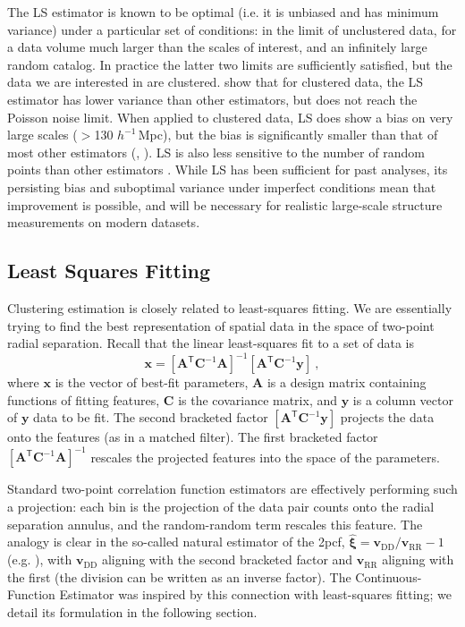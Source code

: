 \documentclass[modern]{aastex62}
\newcommand{\cf}{2pcf\xspace} %
\newcommand{\Est}{The Continuous-Function Estimator\xspace}
\newcommand{\LS}{LS\xspace}
\newcommand{\inv}{^{-1}}
\newcommand{\T}{^{\mathsf{T}}}
\newcommand{\hmpc}{$h^{-1}\,$Mpc}
\newcommand{\bld}[1]{\bm{#1}} %
\newcommand{\vv}[1]{\bld{v}_\mathrm{#1}}
\begin{document}
The \LS estimator is known to be optimal (i.e. it is unbiased and has minimum variance) under a particular set of conditions: in the limit of unclustered data, for a data volume much larger than the scales of interest, and an infinitely large random catalog. 
In practice the latter two limits are sufficiently satisfied, but the data we are interested in are clustered.
\cite{VargasMagana2013} show that for clustered data, the \LS estimator has lower variance than other estimators, but does not reach the Poisson noise limit.
When applied to clustered data, \LS does show a bias on very large scales ($>$130 \hmpc), but the bias is significantly smaller than that of most other estimators (\citealt{Kerscher1999}, \citealt{VargasMagana2013}).
\LS is also less sensitive to the number of random points than other estimators \citep{Kerscher2000}.
While \LS has been sufficient for past analyses, its persisting bias and suboptimal variance under imperfect conditions mean that improvement is possible, and will be necessary for realistic large-scale structure measurements on modern datasets.

\subsection{Least Squares Fitting}

Clustering estimation is closely related to least-squares fitting.
We are essentially trying to find the best representation of spatial data in the space of two-point radial separation.
Recall that the linear least-squares fit to a set of data is
\begin{equation}
\bld{x} = [\bld{A}\T \bld{C}\inv \bld{A}]\inv [\bld{A}\T \bld{C}\inv \bld{y}] ~,
\end{equation}
where $\bld{x}$ is the vector of best-fit parameters, $\bld{A}$ is a design matrix containing functions of fitting features, $\bld{C}$ is the covariance matrix, and $\bld{y}$ is a column vector of $\bld{y}$ data to be fit.
The second bracketed factor $[\bld{A}\T \bld{C}\inv \bld{y}]$ projects the data onto the features (as in a matched filter). 
The first bracketed factor $[\bld{A}\T \bld{C}\inv \bld{A}]\inv$ rescales the projected features into the space of the parameters.

Standard two-point correlation function estimators are effectively performing such a projection: each bin is the projection of the data pair counts onto the radial separation annulus, and the random-random term rescales this feature.
The analogy is clear in the so-called natural estimator of the \cf, $\bld{\hat{\xi}} = \vv{DD}/\vv{RR} - 1$ (e.g. \citealt{Kerscher2000}), with $\vv{DD}$ aligning with the second bracketed factor and $\vv{RR}$ aligning with the first (the division can be written as an inverse factor).
\Est was inspired by this connection with least-squares fitting; we detail its formulation in the following section.
\end{document}
